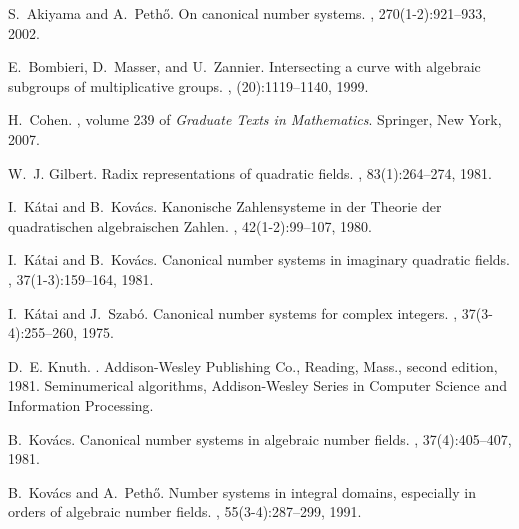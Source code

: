\documentclass{amsart}
\theoremstyle{plain}
\numberwithin{equation}{section}
\theoremstyle{remark}
\begin{document}
\begin{thebibliography}{10}

S.~Akiyama and A.~Peth{\H{o}}.
\newblock On canonical number systems.
, 270(1-2):921--933, 2002.

E.~Bombieri, D.~Masser, and U.~Zannier.
\newblock Intersecting a curve with algebraic subgroups of multiplicative
  groups.
, (20):1119--1140, 1999.

H.~Cohen.
,
  volume 239 of {\em Graduate Texts in Mathematics}.
\newblock Springer, New York, 2007.

W.~J. Gilbert.
\newblock Radix representations of quadratic fields.
, 83(1):264--274, 1981.

I.~K{\'a}tai and B.~Kov{\'a}cs.
\newblock Kanonische {Z}ahlensysteme in der {T}heorie der quadratischen
  algebraischen {Z}ahlen.
, 42(1-2):99--107, 1980.

I.~K{\'a}tai and B.~Kov{\'a}cs.
\newblock Canonical number systems in imaginary quadratic fields.
, 37(1-3):159--164, 1981.

I.~K{\'a}tai and J.~Szab{\'o}.
\newblock Canonical number systems for complex integers.
, 37(3-4):255--260, 1975.

D.~E. Knuth.
.
\newblock Addison-Wesley Publishing Co., Reading, Mass., second edition, 1981.
\newblock Seminumerical algorithms, Addison-Wesley Series in Computer Science
  and Information Processing.

B.~Kov{\'a}cs.
\newblock Canonical number systems in algebraic number fields.
, 37(4):405--407, 1981.

B.~Kov{\'a}cs and A.~Peth{\H{o}}.
\newblock Number systems in integral domains, especially in orders of algebraic
  number fields.
, 55(3-4):287--299, 1991.


\end{thebibliography}
\end{document}
